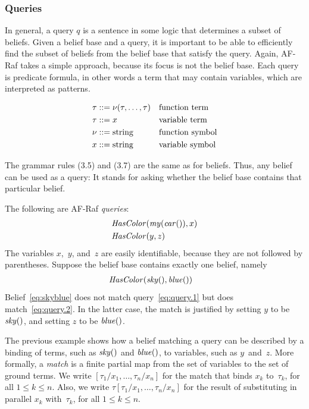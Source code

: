 \documentclass[a4paper,12pt,oneside,fleqn]{book} %
\begin{document}
{\subsubsection{Queries}

In general, a query $q$ is a sentence in some logic that determines a
subset of beliefs.  Given a belief base and a query, it is important to be
able to efficiently find the subset of beliefs from the belief base that
satisfy the query.  Again, AF-Raf takes a simple approach, because its
focus is not the belief base.  Each query is predicate formula, in other
words a term that may contain variables, which are interpreted as patterns.

\begin{align} \tau &::=
\nu(\tau,\ldots,\tau) && \text{function term} \\ \tau &::= x &&
\text{variable term} \\ \nu  &::= {\rm string} &&\text{function symbol} \\
x &::= {\rm string} && \text{variable symbol} \end{align} 

The grammar rules (3.5) and (3.7) are the same as for beliefs.  Thus, any
belief can be used as a query:  It stands for asking whether the belief
base contains that particular belief.

\begin{example} The following are AF-Raf \emph{queries}: \begin{align}
&{\it HasColor}({\it my}({\it car}()), x) \label{eq:query.1} \\ &{\it
HasColor}(y, z) \label{eq:query.2} \end{align} The variables $x$,~$y$,
and~$z$ are easily identifiable, because they are not followed by
parentheses.  Suppose the belief base contains exactly one belief, namely
\begin{align} &{\it HasColor}({\it sky}(), {\it blue}()) \label{eq:skyblue}
\end{align} Belief~\eqref{eq:skyblue} does not match
query~\eqref{eq:query.1} but does match~\eqref{eq:query.2}.  In the latter
case, the match is justified by setting $y$ to be ${\it sky}()$, and
setting $z$ to be ${\it blue}()$.
\end{example}

The previous example shows how a belief matching a query can be described
by a binding of terms, such as ${\it sky}()$ and ${\it blue}()$, to
variables, such as $y$~and~$z$.  More formally, a \emph{match} is a finite
partial map from the set of variables to the set of ground terms.  We write
$[\tau_1/x_1,\ldots,\tau_n/x_n]$ for the match that binds $x_k$
to~$\tau_k$, for all $1\le k\le n$.  Also, we write
$\tau[\tau_1/x_1,\ldots,\tau_n/x_n]$ for the result of substituting in
parallel $x_k$ with~$\tau_k$, for all $1\le k\le n$.

}
\end{document}
